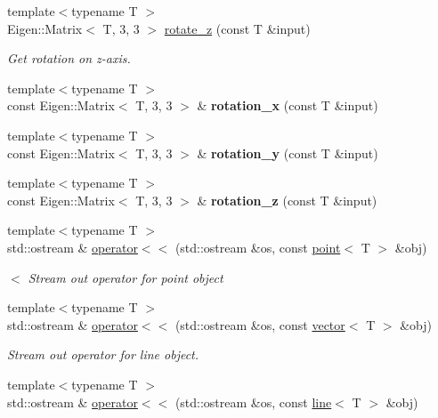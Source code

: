 \begin{DoxyCompactItemize}
{\footnotesize template$<$typename T $>$ }\\Eigen\+::\+Matrix$<$ T, 3, 3 $>$ \hyperlink{namespaceddd_a8b9d6f84cbf4f443881fd3b3abad07e4}{rotate\+\_\+z} (const T \&input)
\begin{DoxyCompactList}\small\item\em Get rotation on z-\/axis. \end{DoxyCompactList}\item 
\mbox{\label{namespaceddd_ae7562b0e49ae64d1740ac6f68f81fdef}} 
{\footnotesize template$<$typename T $>$ }\\const Eigen\+::\+Matrix$<$ T, 3, 3 $>$ \& {\bfseries rotation\+\_\+x} (const T \&input)
\item 
\mbox{\label{namespaceddd_a99646f415772db90f4df4fb5dd4d458d}} 
{\footnotesize template$<$typename T $>$ }\\const Eigen\+::\+Matrix$<$ T, 3, 3 $>$ \& {\bfseries rotation\+\_\+y} (const T \&input)
\item 
\mbox{\label{namespaceddd_a03a4cb214ac10e4199f9cbe342cf68f6}} 
{\footnotesize template$<$typename T $>$ }\\const Eigen\+::\+Matrix$<$ T, 3, 3 $>$ \& {\bfseries rotation\+\_\+z} (const T \&input)
\item 
{\footnotesize template$<$typename T $>$ }\\std\+::ostream \& \hyperlink{namespaceddd_a02d73e2ba5a018e4e525deb8aea3c0a8}{operator$<$$<$} (std\+::ostream \&os, const \hyperlink{classddd_1_1point}{point}$<$ T $>$ \&obj)
\begin{DoxyCompactList}\small\item\em $<$ Stream out operator for point object \end{DoxyCompactList}\item 
{\footnotesize template$<$typename T $>$ }\\std\+::ostream \& \hyperlink{namespaceddd_a85783ffbd6985b1981059732d7bbe174}{operator$<$$<$} (std\+::ostream \&os, const \hyperlink{classddd_1_1vector}{vector}$<$ T $>$ \&obj)
\begin{DoxyCompactList}\small\item\em Stream out operator for line object. \end{DoxyCompactList}\item 
{\footnotesize template$<$typename T $>$ }\\std\+::ostream \& \hyperlink{namespaceddd_a2001eec5d960802592e1ca6a5b0dc203}{operator$<$$<$} (std\+::ostream \&os, const \hyperlink{classddd_1_1line}{line}$<$ T $>$ \&obj)

\end{DoxyCompactItemize}
